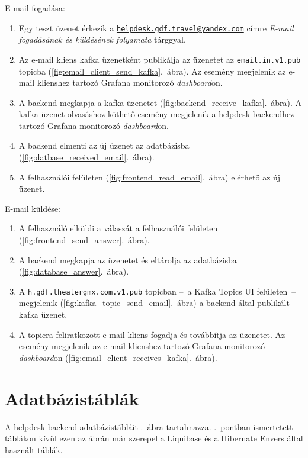E-mail fogadása:
\begin{enumerate}
	\item Egy teszt üzenet érkezik a \href{mailto:helpdesk.gdf.travel@yandex.com}{\nolinkurl{helpdesk.gdf.travel@yandex.com}} címre
	\emph{E-mail fogadásának és küldésének folyamata} tárggyal.
	\item Az e-mail kliens kafka üzenetként publikálja az üzenetet az \texttt{email.in.v1.pub} topicba (\ref{fig:email_client_send_kafka}.~ábra). Az esemény megjelenik az e-mail klienshez tartozó Grafana monitorozó \emph{dashboard}on.
	\item A backend megkapja a kafka üzenetet (\ref{fig:backend_receive_kafka}.~ábra). A kafka üzenet olvasáshoz köthető esemény megjelenik a helpdesk backendhez tartozó Grafana monitorozó \emph{dashboard}on.
	\item A backend elmenti az új üzenet az adatbázisba (\ref{fig:datbase_received_email}.~ábra).
	\item A felhasználói felületen (\ref{fig:frontend_read_email}.~ábra) elérhető az új üzenet.
\end{enumerate}

\bigskip

E-mail küldése:
\begin{enumerate}
	\item A felhasználó elküldi a válaszát a felhasználói felületen (\ref{fig:frontend_send_answer}.~ábra).
	\item A backend megkapja az üzenetet és eltárolja az adatbázisba (\ref{fig:database_answer}.~ábra).
	\item A \texttt{h.gdf.theater\textunderscore gmx.com.v1.pub} topicban --~a Kafka Topics UI felületen~-- megjelenik (\ref{fig:kafka_topic_send_email}.~ábra) a backend által publikált kafka üzenet.
	\item A topicra feliratkozott e-mail kliens fogadja és továbbítja az üzenetet. Az esemény megjelenik az e-mail klienshez tartozó Grafana monitorozó \emph{dashboard}on (\ref{fig:email_client_receives_kafka}.~ábra).
\end{enumerate}
 


\newpage
\section{Adatbázistáblák}
A helpdesk backend adatbázistábláit .~ábra tartalmazza. .~pontban ismertetett táblákon kívül ezen az ábrán már szerepel a Liquibase és a Hibernate Envers által használt táblák.

